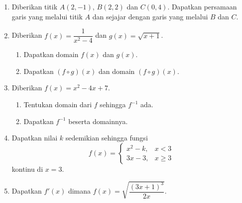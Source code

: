\documentclass[11pt,openany,a4paper]{article}
\begin{document}
\begin{enumerate}
    \item Diberikan titik $A(2,-1)$, $B(2,2)$ dan $C(0,4)$. Dapatkan persamaan garis yang melalui titik $A$ dan sejajar dengan garis yang melalui $B$ dan $C$.

    \item Diberikan $f(x) = \dfrac{1}{x^2 - 4}$ dan $g(x) = \sqrt{x+1}$.
          \begin{enumerate}
              \item Dapatkan domain $f(x)$ dan $g(x)$.
              \item Dapatkan $(f \circ g)(x)$ dan domain $(f \circ g)(x)$.
          \end{enumerate}

    \item Diberikan $f(x) = x^2 - 4x + 7$.
          \begin{enumerate}
              \item Tentukan domain dari $f$ sehingga $f^{-1}$ ada.
              \item Dapatkan $f^{-1}$ beserta domainnya.
          \end{enumerate}

    \item Dapatkan nilai $k$ sedemikian sehingga fungsi
          \[
              f(x) =
              \begin{cases}
                  x^2 - k, & x < 3    \\
                  3x - 3,  & x \geq 3
              \end{cases}
          \]
          kontinu di $x=3$.

    \item Dapatkan $f'(x)$ dimana
          $
              f(x) = \sqrt{\dfrac{(3x+1)^3}{2x}}.
          $

\end{enumerate}

\end{document}
